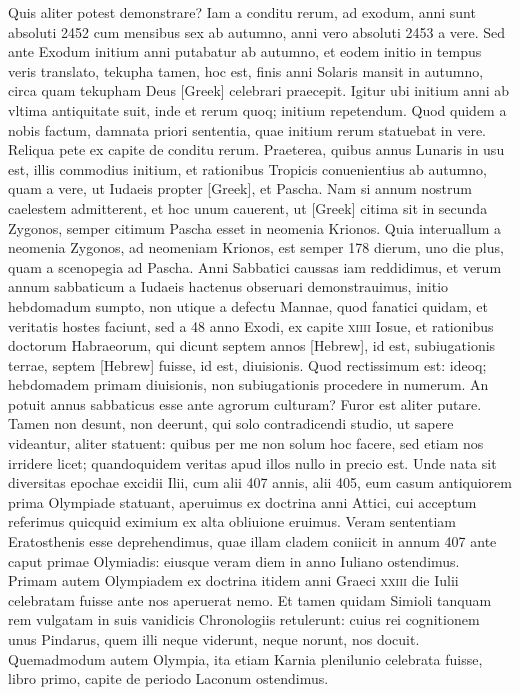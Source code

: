Quis aliter potest demonstrare?
Iam a conditu rerum, ad exodum,
anni sunt absoluti 2452 cum mensibus sex ab autumno, anni vero
absoluti 2453 a vere.
Sed ante Exodum initium anni putabatur ab
autumno, et eodem initio in tempus veris translato, tekupha tamen,
hoc est, finis anni Solaris mansit in autumno, circa quam tekupham
Deus \textgreek{[Greek]} celebrari praecepit.
Igitur ubi initium anni
ab vltima antiquitate suit, inde et rerum quoq; initium repetendum.
Quod quidem a nobis factum, damnata priori sententia, quae
initium rerum statuebat in vere.
Reliqua pete ex capite de conditu
rerum.
Praeterea, quibus annus Lunaris in usu est, illis commodius
initium, et rationibus Tropicis conuenientius ab autumno, quam
a vere, ut Iudaeis propter \textgreek{[Greek]}, et Pascha.
Nam si annum
nostrum caelestem admitterent, et hoc unum cauerent, ut \textgreek{[Greek]}
citima sit in secunda Zygonos, semper citimum Pascha esset in neomenia
Krionos.
Quia interuallum a neomenia Zygonos, ad neomeniam
Krionos, est semper 178 dierum, uno die plus, quam a scenopegia
ad Pascha.
Anni Sabbatici caussas iam reddidimus, et verum
annum sabbaticum a Iudaeis hactenus obseruari demonstrauimus,
initio hebdomadum sumpto, non utique a defectu Mannae,
quod fanatici quidam, et veritatis hostes faciunt, sed a 48 anno Exodi,
ex capite \textsc{xiiii} Iosue, et rationibus doctorum Habraeorum, qui
dicunt septem annos \texthebrew{[Hebrew]}, id est, subiugationis terrae,
septem \texthebrew{[Hebrew]}
fuisse, id est, diuisionis.
Quod rectissimum est: ideoq; hebdomadem
primam diuisionis, non subiugationis procedere in numerum.
An
potuit annus sabbaticus esse ante agrorum culturam?
Furor est aliter putare.
Tamen non desunt, non deerunt, qui solo contradicendi
studio, ut sapere videantur, aliter statuent: quibus per me non solum
hoc facere, sed etiam nos irridere licet; quandoquidem veritas apud
illos nullo in precio est.
Unde nata sit diversitas epochae excidii Ilii,
cum alii 407 annis, alii 405, eum casum antiquiorem prima Olympiade
statuant, aperuimus ex doctrina anni Attici, cui acceptum
referimus quicquid eximium ex alta obliuione eruimus.
Veram sententiam
Eratosthenis esse deprehendimus, quae illam cladem coniicit
in annum 407 ante caput primae Olymiadis: eiusque veram
diem in anno Iuliano ostendimus.
Primam autem Olympiadem
ex doctrina itidem anni Graeci \textsc{xxiii} die Iulii celebratam fuisse ante
nos aperuerat nemo.
Et tamen quidam Simioli tanquam rem
vulgatam in suis vanidicis Chronologiis retulerunt: cuius rei cognitionem
unus Pindarus, quem illi neque viderunt, neque norunt, nos
docuit.
Quemadmodum autem Olympia, ita etiam Karnia plenilunio
celebrata fuisse, libro primo, capite de periodo Laconum
ostendimus.

